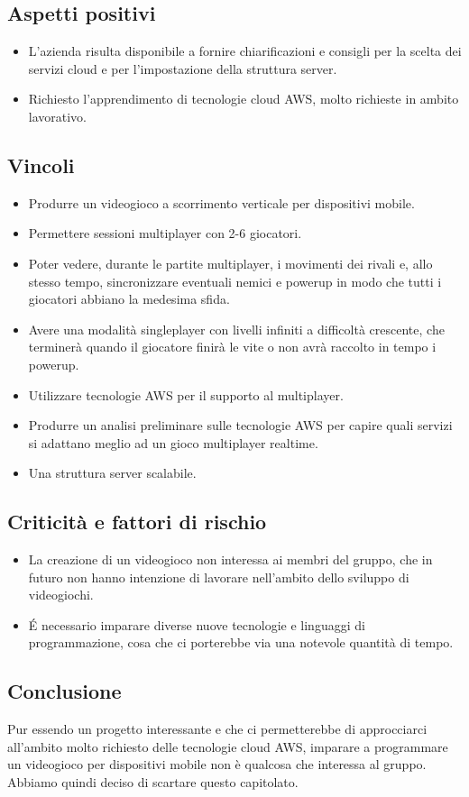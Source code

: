 \subsection{Aspetti positivi}
\begin{itemize}
\item L'azienda risulta disponibile a fornire chiarificazioni e consigli per la scelta dei servizi cloud e per l'impostazione della struttura server.
\item Richiesto l'apprendimento di tecnologie cloud AWS, molto richieste in ambito lavorativo.
\end{itemize}

\subsection{Vincoli}
\begin{itemize}
\item Produrre un videogioco a scorrimento verticale per dispositivi mobile.
\item Permettere sessioni multiplayer con 2-6 giocatori.
\item Poter vedere, durante le partite multiplayer, i movimenti dei rivali e, allo stesso tempo, sincronizzare eventuali nemici e powerup in modo che tutti i giocatori abbiano la medesima sfida.
\item Avere una modalità singleplayer con livelli infiniti a difficoltà crescente, che terminerà quando il giocatore finirà le vite o non avrà raccolto in tempo i powerup.
\item Utilizzare tecnologie AWS per il supporto al multiplayer.
\item Produrre un analisi preliminare sulle tecnologie AWS per capire quali servizi si adattano meglio ad un gioco multiplayer realtime.
\item Una struttura server scalabile.
\end{itemize}

\subsection{Criticità e fattori di rischio}
\begin{itemize}
\item La creazione di un videogioco non interessa ai membri del gruppo, che in futuro non hanno intenzione di lavorare nell'ambito dello sviluppo di videogiochi.
\item É necessario imparare diverse nuove tecnologie e linguaggi di programmazione, cosa che ci porterebbe via una notevole quantità di tempo.
\end{itemize}

\subsection{Conclusione}
Pur essendo un progetto interessante e che ci permetterebbe di approcciarci all'ambito molto richiesto delle tecnologie cloud AWS, imparare a programmare un videogioco per dispositivi mobile non è qualcosa che interessa al gruppo. Abbiamo quindi deciso di scartare questo capitolato.